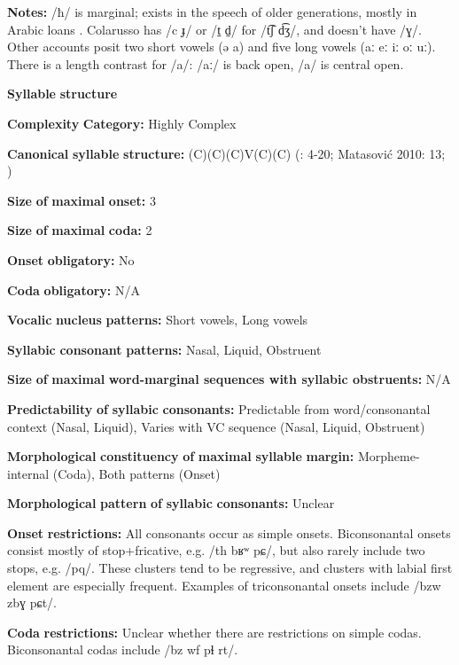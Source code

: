 \begin{styleBody}
\textbf{Notes:} /ħ/ is marginal; exists in the speech of older generations, mostly in Arabic loans \citep[10]{Matasovic2010}. Colarusso has /c ɟ/ or /t̠ d̠/ for /t͡ʃ d͡ʒ/, and doesn’t have /ɣ/. Other accounts posit two short vowels (ə a) and five long vowels (aː eː iː oː uː). There is a length contrast for /a/: /aː/ is back open, /a/ is central open.

\textbf{Syllable} \textbf{structure}

\textbf{Complexity} \textbf{Category:} Highly Complex

\textbf{Canonical} \textbf{syllable} \textbf{structure:} (C)(C)(C)V(C)(C) (\citealt{Colarusso2006}: 4-20; Matasović 2010: 13; \citealt{Applebaum2013})

\textbf{Size} \textbf{of} \textbf{maximal} \textbf{onset:} 3

\textbf{Size} \textbf{of} \textbf{maximal} \textbf{coda:} 2

\textbf{Onset} \textbf{obligatory:} No

\textbf{Coda} \textbf{obligatory:} N/A

\textbf{Vocalic} \textbf{nucleus} \textbf{patterns:} Short vowels, Long vowels

\textbf{Syllabic} \textbf{consonant} \textbf{patterns:} Nasal, Liquid, Obstruent

\textbf{Size} \textbf{of} \textbf{maximal} \textbf{word{}-marginal sequences with syllabic obstruents:} N/A

\textbf{Predictability} \textbf{of} \textbf{syllabic} \textbf{consonants:} Predictable from word/consonantal context (Nasal, Liquid), Varies with VC sequence (Nasal, Liquid, Obstruent)

\textbf{Morphological} \textbf{constituency} \textbf{of} \textbf{maximal} \textbf{syllable} \textbf{margin:} Morpheme-internal (Coda), Both patterns (Onset)

\textbf{Morphological} \textbf{pattern} \textbf{of} \textbf{syllabic} \textbf{consonants:} Unclear

\textbf{Onset} \textbf{restrictions:} All consonants occur as simple onsets. Biconsonantal onsets consist mostly of stop+fricative, e.g. /th bʁʷ pɕ/, but also rarely include two stops, e.g. /pq/. These clusters tend to be regressive, and clusters with labial first element are especially frequent. Examples of triconsonantal onsets include /bzw zbɣ pɕt/.

\textbf{Coda} \textbf{restrictions:} Unclear whether there are restrictions on simple codas. Biconsonantal codas include /bz wf pɬ rt/.


\end{styleBody}
